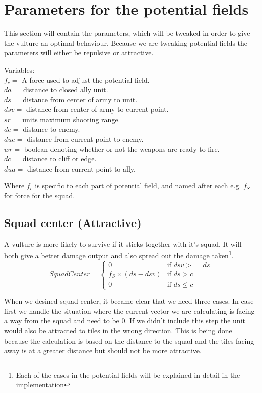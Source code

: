 \section{Parameters for the potential fields}
	This section will contain the parameters, which will be tweaked in order to give the vulture an optimal behaviour. Because we are tweaking 
	potential fields the parameters will either be repulsive or attractive.
	
	Variables:\\
	$f_c =$ A force used to adjust the potential field.\\
	$da =$ distance to closed ally unit.\\
	$ds =$ distance from center of army to unit.\\
	$dsv =$ distance from center of army to current point.\\
	$sr =$ units maximum shooting range.\\
	$de =$ distance to enemy.\\
	$due =$ distance from current point to enemy.\\
	$wr =$ boolean denoting whether or not the weapons are ready to fire.\\
	$dc =$ distance to cliff or edge. \\
	$dua =$ distance from current point to ally.
	
	Where $f_c$ is specific to each part of potential field, and named after each e.g. $f_{S}$ for force for the squad.
	
	\subsection*{Squad center (Attractive)}
		\label{SCA_label}A vulture is more likely to survive if it sticks together with it's squad. It will both give a better damage output and also spread out the 
		damage taken\footnote{Each of the cases in the potential fields will be explained in detail in the implementation}.
		\begin{displaymath}
			SquadCenter  = \begin{cases}
					0 & \text{if } dsv >= ds\\
					f_{S} \times (ds - dsv) & \text{if } ds > c\\
					0 & \text{if } ds \leq c
				\end{cases}		
		\end{displaymath}
		
		When we desined squad center, it became clear that we need three cases. 
		In case first we handle the situation where the current vector we are calculating is facing a way from the squad and need to be 0. If we didn't include this step the unit would also be attracted to tiles in the wrong direction. This is being done because the calculation is based on the distance to the squad and the tiles facing away is at a greater distance but should not be more attractive.
		
